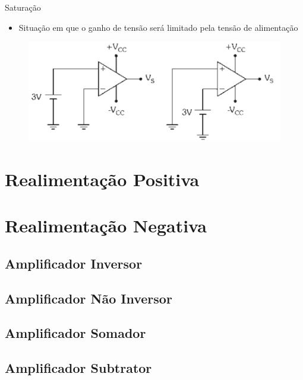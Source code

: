 \documentclass[aspectratio=169,
				xcolor=table]{beamer}
\begin{document}
	\begin{frame}{Saturação}
		\begin{itemize}
			\item Situação em que o ganho de tensão será limitado pela tensão de alimentação
		\end{itemize}
		
		\begin{figure}[hbtp]
		\centering
		\includegraphics[height=.5\textheight, keepaspectratio]{../figs/cap02/saturacao}
		\end{figure}
	
	\end{frame}
	
	
	\section{Realimentação Positiva}
	
	\section{Realimentação Negativa}
	
	\subsection{Amplificador Inversor}
	
	\subsection{Amplificador Não Inversor}
	
	\subsection{Amplificador Somador}
	
	\subsection{Amplificador Subtrator}
\end{document}
